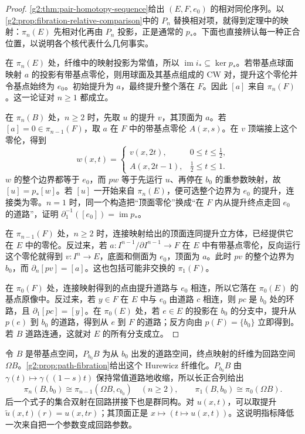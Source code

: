 \begin{proof}
	\cref{g2:thm:pair-homotopy-sequence}给出 \((E,F,e_0)\) 的相对同伦序列。以\cref{g2:prop:fibration-relative-comparison}中的 \(P_n\) 替换相对项，就得到定理中的映射：\(\pi_n(E)\) 先相对化再由 \(P_n\) 投影，正是通常的 \(p_*\)。下面也直接辨认每一种正合位置，以说明各个核代表什么几何事实。

	在 \(\pi_n(E)\) 处，纤维中的映射投影为常值，所以 \(\operatorname{im}i_*\subseteq\ker p_*\)。若带基点球面映射 \(a\) 的投影有带基点零伦，则用球面及其基点组成的 CW 对，提升这个零伦并令基点始终为 \(e_0\)。初始提升为 \(a\)，最终提升整个落在 \(F\)。因此 \([a]\) 来自 \(\pi_n(F)\)。这一论证对 \(n\ge1\) 都成立。

	在 \(\pi_n(B)\) 处，\(n\ge2\) 时，先取 \(u\) 的提升 \(v\)，其顶面为 \(a\)。若 \([a]=0\in\pi_{n-1}(F)\)，取 \(a\) 在 \(F\) 中的带基点零伦 \(A(x,s)\)。在 \(v\) 顶端接上这个零伦，得到
	\[
		w(x,t)=
		\begin{cases}
			v(x,2t),&0\le t\le\tfrac12,\\
			A(x,2t-1),&\tfrac12\le t\le1.
		\end{cases}
	\]
	\(w\) 的整个边界都等于 \(e_0\)，而 \(pw\) 等于先运行 \(u\)、再停在 \(b_0\) 的重参数映射，故 \([u]=p_*[w]\)。若 \([u]\) 一开始来自 \(\pi_n(E)\)，便可选整个边界为 \(e_0\) 的提升，连接类为零。\(n=1\) 时，同一个构造把“顶面零伦”换成“在 \(F\) 内从提升终点走回 \(e_0\) 的道路”，证明 \(\partial_1^{-1}([e_0])=\operatorname{im}p_*\)。

	在 \(\pi_{n-1}(F)\) 处，\(n\ge2\) 时，连接映射给出的顶面连同提升立方体，已经提供它在 \(E\) 中的零伦。反过来，若 \(a:I^{n-1}/\partial I^{n-1}\to F\) 在 \(E\) 中有带基点零伦，反向运行这个零伦就得到 \(v:I^n\to E\)，底面和侧面为 \(e_0\)，顶面为 \(a\)。此时 \(pv\) 的整个边界为 \(b_0\)，而 \(\partial_n[pv]=[a]\)。这也包括可能非交换的 \(\pi_1(F)\)。

	在 \(\pi_0(F)\) 处，连接映射得到的点由提升道路与 \(e_0\) 相连，所以它落在 \(\pi_0(E)\) 的基点原像中。反过来，若 \(y\in F\) 在 \(E\) 中与 \(e_0\) 由道路 \(c\) 相连，则 \(pc\) 是 \(b_0\) 处的环路，且 \(\partial_1[pc]=[y]\)。在 \(\pi_0(E)\) 处，若 \(e\in E\) 的投影在 \(b_0\) 的分支中，提升从 \(p(e)\) 到 \(b_0\) 的道路，得到从 \(e\) 到 \(F\) 的道路；反方向由 \(p(F)=\{b_0\}\) 立即得到。若 \(B\) 道路连通，这就对 \(E\) 的所有分支成立。
\end{proof}

\begin{example}
	\label{g2:exm:loop-space-shift}
	令 \(B\) 是带基点空间，\(P_{b_0}B\) 为从 \(b_0\) 出发的道路空间，终点映射的纤维为回路空间 \(\Omega B\)。\cref{g2:prop:path-fibration}给出这个 Hurewicz 纤维化。\(P_{b_0}B\) 由 \(\gamma(t)\mapsto\gamma((1-s)t)\) 保持常值道路地收缩，所以长正合列给出
	\[
		\pi_n(B,b_0)\cong\pi_{n-1}(\Omega B,c_{b_0})\quad(n\ge2),
		\qquad \pi_1(B,b_0)\cong\pi_0(\Omega B).
	\]
	后一个式子的集合双射在回路拼接下也是群同构。对 \(u(x,t)\)，可以取提升 \(\widetilde u(x,t)(r)=u(x,tr)\)；其顶面正是 \(x\mapsto(t\mapsto u(x,t))\)。这说明指标降低一次来自把一个参数变成回路参数。
\end{example}

